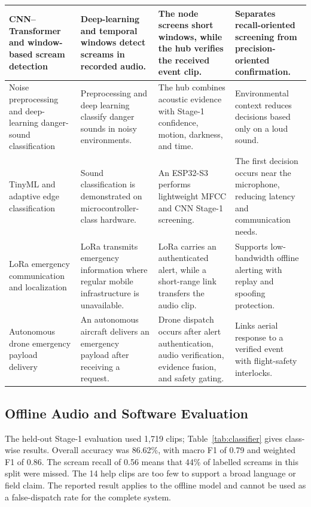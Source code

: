 \documentclass[conference]{IEEEtran}
\begin{document}
\begin{table}[!t]
\begin{tabularx}{\textwidth}{|
>{\raggedright\arraybackslash}p{3.15cm}|
>{\raggedright\arraybackslash}X|
>{\raggedright\arraybackslash}X|
>{\raggedright\arraybackslash}X|}
CNN--Transformer and window-based scream detection~\cite{kim2025} &
Deep-learning and temporal windows detect screams in recorded audio. &
The node screens short windows, while the hub verifies the received event clip. &
Separates recall-oriented screening from precision-oriented confirmation. \\
\hline

Noise preprocessing and deep-learning danger-sound classification~\cite{fime2024} &
Preprocessing and deep learning classify danger sounds in noisy environments. &
The hub combines acoustic evidence with Stage-1 confidence, motion, darkness, and time. &
Environmental context reduces decisions based only on a loud sound. \\
\hline

TinyML and adaptive edge classification~\cite{trigkas2026} &
Sound classification is demonstrated on microcontroller-class hardware. &
An ESP32-S3 performs lightweight MFCC and CNN Stage-1 screening. &
The first decision occurs near the microphone, reducing latency and communication needs. \\
\hline

LoRa emergency communication and localization~\cite{sciullo2020} &
LoRa transmits emergency information where regular mobile infrastructure is unavailable. &
LoRa carries an authenticated alert, while a short-range link transfers the audio clip. &
Supports low-bandwidth offline alerting with replay and spoofing protection. \\
\hline

Autonomous drone emergency payload delivery~\cite{smith2025} &
An autonomous aircraft delivers an emergency payload after receiving a request. &
Drone dispatch occurs after alert authentication, audio verification, evidence fusion, and safety gating. &
Links aerial response to a verified event with flight-safety interlocks. \\
\hline

\end{tabularx}
\end{table}

\subsection{Offline Audio and Software Evaluation}
The held-out Stage-1 evaluation used 1,719 clips; Table~\ref{tab:classifier} gives class-wise results. Overall accuracy was 86.62\%, with macro F1 of 0.79 and weighted F1 of 0.86. The scream recall of 0.56 means that 44\% of labelled screams in this split were missed. The 14 help clips are too few to support a broad language or field claim. The reported result applies to the offline model and cannot be used as a false-dispatch rate for the complete system.
\end{document}
